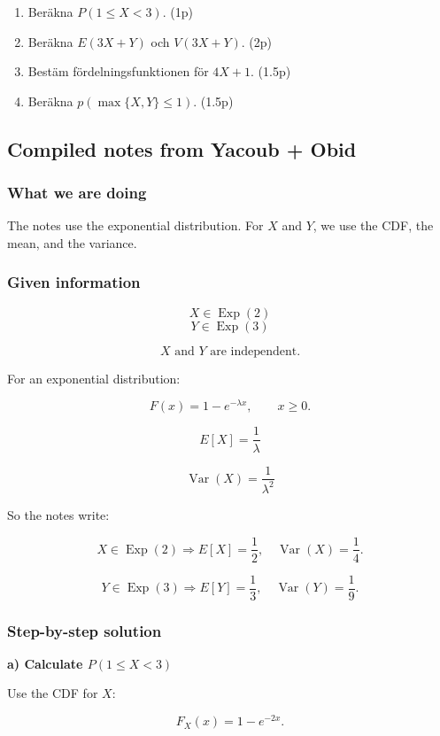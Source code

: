 \documentclass[10pt]{article}
\begin{document}
\begin{enumerate}[label=\alph*)]
\item Beräkna \(P(1 \leq X < 3)\). \hfill (1p)
\item Beräkna \(E(3X+Y)\) och \(V(3X+Y)\). \hfill (2p)
\item Bestäm fördelningsfunktionen för \(4X+1\). \hfill (1.5p)
\item Beräkna \(p(\max\{X,Y\}\leq 1)\). \hfill (1.5p)
\end{enumerate}

\subsection*{Compiled notes from Yacoub + Obid}

\subsubsection*{What we are doing}
The notes use the exponential distribution.
For \(X\) and \(Y\), we use the CDF,
the mean, and the variance.

\subsubsection*{Given information}
\[
X\in \operatorname{Exp}(2)
\]
\[
Y\in \operatorname{Exp}(3)
\]

\[
X \text{ and } Y
\text{ are independent.}
\]

For an exponential distribution:

\[
F(x)=1-e^{-\lambda x},
\qquad x\geq 0.
\]

\[
E[X]=\frac{1}{\lambda}
\]

\[
\operatorname{Var}(X)=\frac{1}{\lambda^2}
\]

So the notes write:

\[
X\in \operatorname{Exp}(2)
\Rightarrow
E[X]=\frac{1}{2},
\quad
\operatorname{Var}(X)=\frac{1}{4}.
\]

\[
Y\in \operatorname{Exp}(3)
\Rightarrow
E[Y]=\frac{1}{3},
\quad
\operatorname{Var}(Y)=\frac{1}{9}.
\]

\subsubsection*{Step-by-step solution}

\textbf{a) Calculate \(P(1\leq X<3)\)}

Use the CDF for \(X\):

\[
F_X(x)=1-e^{-2x}.
\]
\end{document}
